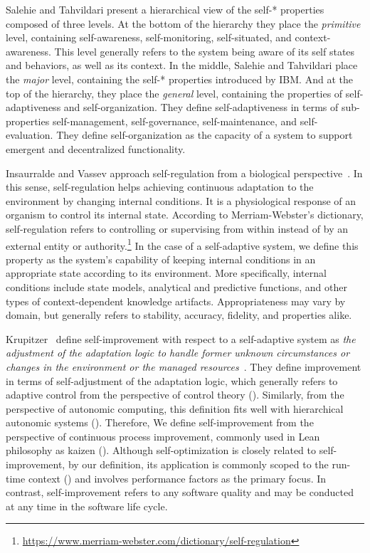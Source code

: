 Salehie and Tahvildari present a hierarchical view of the self-* properties composed of three levels. At the bottom of the hierarchy they place the \emph{primitive} level, containing self-awareness, self-monitoring, self-situated, and context-awareness. This level generally refers to the system being aware of its self states and behaviors, as well as its context. In the middle, Salehie and Tahvildari place the \emph{major} level, containing the self-* properties introduced by IBM. And at the top of the hierarchy, they place the \emph{general} level, containing the properties of self-adaptiveness and self-organization. They define self-adaptiveness in terms of sub-properties self-management, self-governance, self-maintenance, and self-evaluation. They define self-organization as the capacity of a system to support emergent and decentralized functionality.

Insaurralde and Vassev approach self-regulation from a biological perspective~\cite{insaurralde-2015-autonomic}. In this sense, self-regulation helps achieving continuous adaptation to the environment by changing internal conditions. It is a physiological response of an organism to control its internal state. According to Merriam-Webster's dictionary, self-regulation refers to controlling or supervising from within instead of by an external entity or authority.\footnote{\url{https://www.merriam-webster.com/dictionary/self-regulation}} In the case of a self-adaptive system, we define this property as the system's capability of keeping internal conditions in an appropriate state according to its environment. More specifically, internal conditions include state models, analytical and predictive functions, and other types of context-dependent knowledge artifacts. Appropriateness may vary by domain, but generally refers to stability, accuracy, fidelity, and properties alike.

Krupitzer~\etal{} define self-improvement with respect to a self-adaptive system as \emph{the adjustment of the adaptation logic to handle former unknown circumstances or changes in the environment or the managed resources}~\cite{krupitzer-2016-comparison}. They define improvement in terms of self-adjustment of the adaptation logic, which generally refers to adaptive control from the perspective of control theory (). Similarly, from the perspective of autonomic computing, this definition fits well with hierarchical autonomic systems (). Therefore, We define self-improvement from the perspective of continuous process improvement, commonly used in Lean philosophy as kaizen (). Although self-optimization is closely related to self-improvement, by our definition, its application is commonly scoped to the run-time context () and involves performance factors as the primary focus. In contrast, self-improvement refers to any software quality and may be conducted at any time in the software life cycle.

